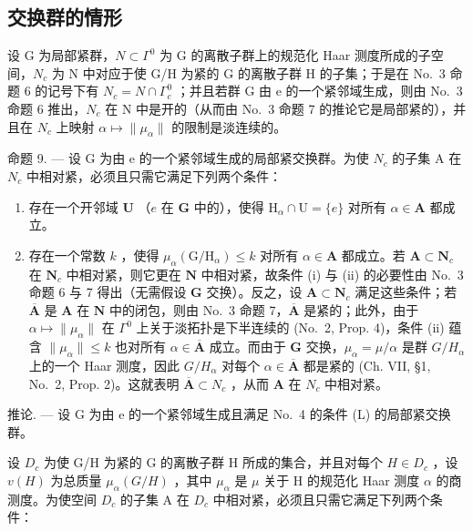 \subsection{交换群的情形}

设 G 为局部紧群，\(N \subset \Gamma^{0}\) 为 G 的离散子群上的规范化 Haar 测度所成的子空间，\(N_{c}\) 为 N 中对应于使 G/H 为紧的 G 的离散子群 H 的子集；于是在 No.~3 命题 6 的记号下有 \(N_{c} = N \cap \Gamma_{c}^{0}\) ；并且若群 G 由 e 的一个紧邻域生成，则由 No.~3 命题 6 推出，\(N_{c}\) 在 N 中是开的（从而由 No.~3 命题 7 的推论它是局部紧的），并且在 \(N_{c}\) 上映射 \(\alpha \mapsto \|\mu_{\alpha}\|\) 的限制是淡连续的。

命题 9. --- 设 G 为由 e 的一个紧邻域生成的局部紧交换群。为使 \(N_{c}\) 的子集 A 在 \(N_{c}\) 中相对紧，必须且只需它满足下列两个条件：

\begin{enumerate}
\def\labelenumi{(\roman{enumi})}
\item
  存在一个开邻域 \(\mathbf{U}\) （\(e\) 在 \(\mathbf{G}\) 中的），使得 \(\mathrm{H}_{\alpha} \cap \mathrm{U} = \{e\}\) 对所有 \(\alpha \in \mathbf{A}\) 都成立。
\item
  存在一个常数 \(k\) ，使得 \(\mu_{\alpha}(\mathrm{G} / \mathrm{H}_{\alpha}) \leqslant k\) 对所有 \(\alpha \in \mathbf{A}\) 都成立。若 \(\mathbf{A} \subset \mathbf{N}_c\) 在 \(\mathbf{N}_c\) 中相对紧，则它更在 \(\mathbf{N}\) 中相对紧，故条件 (i) 与 (ii) 的必要性由 No.~3 命题 6 与 7 得出（无需假设 \(\mathbf{G}\) 交换）。反之，设 \(\mathbf{A} \subset \mathbf{N}_c\) 满足这些条件；若 \(\overline{\mathbf{A}}\) 是 \(\mathbf{A}\) 在 \(\mathbf{N}\) 中的闭包，则由 No.~3 命题 7，\(\overline{\mathbf{A}}\) 是紧的；此外，由于 \(\alpha \mapsto \| \mu_{\alpha} \|\) 在 \(\Gamma^0\) 上关于淡拓扑是下半连续的 (No.~2, Prop. 4)，条件 (ii) 蕴含 \(\| \mu_{\alpha} \| \leqslant k\) 也对所有 \(\alpha \in \overline{\mathbf{A}}\) 成立。而由于 \(\mathbf{G}\) 交换，\(\mu_{\alpha} = \mu / \alpha\) 是群 \(G / H_{\alpha}\) 上的一个 Haar 测度，因此 \(G / H_{\alpha}\) 对每个 \(\alpha \in \overline{\mathbf{A}}\) 都是紧的 (Ch. VII, §1, No.~2, Prop. 2)。这就表明 \(\overline{\mathbf{A}} \subset N_c\) ，从而 \(\mathbf{A}\) 在 \(N_c\) 中相对紧。
\end{enumerate}

推论. --- 设 G 为由 e 的一个紧邻域生成且满足 No.~4 的条件 (L) 的局部紧交换群。

设 \(D_c\) 为使 G/H 为紧的 G 的离散子群 H 所成的集合，并且对每个 \(H \in D_c\) ，设 \(v(H)\) 为总质量 \(\mu_\alpha(G/H)\) ，其中 \(\mu_\alpha\) 是 \(\mu\) 关于 H 的规范化 Haar 测度 \(\alpha\) 的商测度。为使空间 \(D_c\) 的子集 A 在 \(D_c\) 中相对紧，必须且只需它满足下列两个条件：

